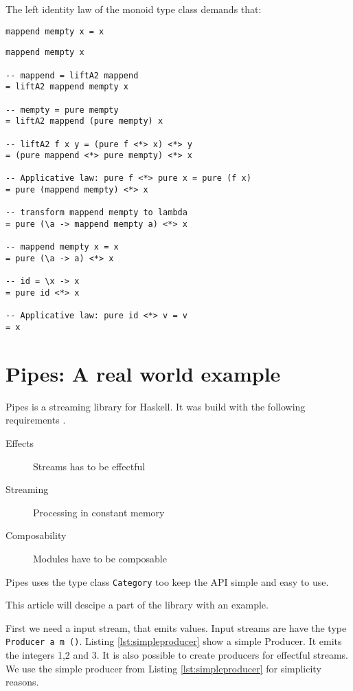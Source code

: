 \documentclass[twoside, a4paper]{article}
\begin{document}
The left identity law of the monoid type class demands that:
\begin{verbatim}
mappend mempty x = x
\end{verbatim}

\begin{verbatim}
mappend mempty x

-- mappend = liftA2 mappend  
= liftA2 mappend mempty x

-- mempty = pure mempty   
= liftA2 mappend (pure mempty) x

-- liftA2 f x y = (pure f <*> x) <*> y
= (pure mappend <*> pure mempty) <*> x

-- Applicative law: pure f <*> pure x = pure (f x)
= pure (mappend mempty) <*> x

-- transform mappend mempty to lambda
= pure (\a -> mappend mempty a) <*> x

-- mappend mempty x = x
= pure (\a -> a) <*> x

-- id = \x -> x
= pure id <*> x

-- Applicative law: pure id <*> v = v
= x
\end{verbatim}

\section{Pipes: A real world example}
\label{sec:pipes}

Pipes is a streaming library for Haskell. It was build with the following requirements \cite{gonzales13}.
\begin{description}
\item[Effects] Streams has to be effectful
\item[Streaming] Processing in constant memory
\item[Composability] Modules have to be composable
\end{description}

Pipes uses the type class \verb|Category| too keep the API simple and easy to use.

This article will descipe a part of the library with an example.

First we need a input stream, that emits values. Input streams are have the type 
\verb|Producer a m ()|.
Listing \ref{lst:simpleproducer} show a simple Producer. It emits the integers 1,2 and 3. It is also possible to create producers for effectful streams. We use the simple producer from Listing \ref{lst:simpleproducer} for simplicity reasons.
\end{document}
